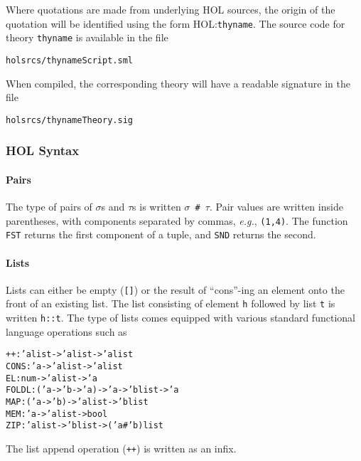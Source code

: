 \documentclass[11pt]{article}
\newcommand{\eg}{\emph{e.g.}}
\newcommand{\HOLfile}[1]{HOL:\texttt{#1}}
\begin{document}
Where quotations are made from underlying HOL sources, the origin of
the quotation will be identified using the form \HOLfile{thyname}.
The source code for theory \texttt{thyname} is available in the file
\begin{alltt}
   holsrcs/thynameScript.sml
\end{alltt}
When compiled, the corresponding theory will have a readable
signature in the file
\begin{alltt}
   holsrcs/thynameTheory.sig
\end{alltt}

\subsubsection{HOL Syntax}

\paragraph{Pairs} The type of pairs of $\sigma$s and $\tau$s is
written \texttt{$\sigma$~\#~$\tau$}.  Pair values are written inside
parentheses, with components separated by commas, \eg, \texttt{(1,4)}.
 The function \texttt{FST} returns the first
component of a tuple, and \texttt{SND} returns
the second.

\paragraph{Lists} Lists can either be empty (\texttt{[]}) or the
result of ``cons''-ing an element onto the front of an
existing list.  The list consisting of element \texttt{h} followed by
list \texttt{t} is written \texttt{h::t}. The type of lists comes
equipped with various standard functional language operations such as
%
%
%
%
%
%
%
\begin{alltt}
   ++    : 'a list -> 'a list -> 'a list
   CONS  : 'a -> 'a list -> 'a list
   EL    : num -> 'a list -> 'a
   FOLDL : ('a -> 'b -> 'a) -> 'a -> 'b list -> 'a
   MAP   : ('a -> 'b) -> 'a list -> 'b list
   MEM   : 'a -> 'a list -> bool
   ZIP   : 'a list -> 'b list -> ('a # 'b) list
\end{alltt}
The list append operation (\texttt{++}) is written as an infix.
\end{document}
